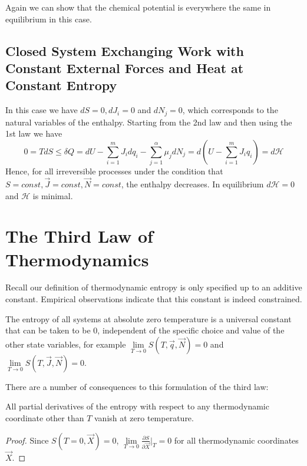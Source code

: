 \documentclass[12pt, a4paper, oneside, openright, titlepage]{book}
\begin{document}
Again we can show that the chemical potential is everywhere the same in equilibrium in this case.

\subsection{Closed System Exchanging Work with Constant External Forces and Heat at Constant Entropy}

In this case we have $dS = 0, dJ_i = 0$ and $dN_j = 0$, which corresponds to the natural variables of the enthalpy. Starting from the 2nd law and then using the 1st law we have \begin{equation*}
    0 = TdS \leq \delta Q = dU - \sum_{i=1}^mJ_idq_i - \sum_{j=1}^{\alpha}\mu_jdN_j = d\left(U-\sum_{i=1}^mJ_iq_i\right) = d\mathcal{H}
\end{equation*}
Hence, for all irreversible processes under the condition that $S = const, \vec{J} = const, \vec{N} = const$, the enthalpy decreases. In equilibrium $d\mathcal{H} = 0$ and $\mathcal{H}$ is minimal.







\section{The Third Law of Thermodynamics}

Recall our definition of thermodynamic entropy is only specified up to an additive constant. Empirical observations indicate that this constant is indeed constrained.

\begin{law}
    The entropy of all systems at absolute zero temperature is a universal constant that can be taken to be $0$, independent of the specific choice and value of the other state variables, for example $\lim\limits_{T\rightarrow 0}S(T,\vec{q},\vec{N}) = 0$ and $\lim\limits_{T\rightarrow 0}S(T,\vec{J},\vec{N}) = 0$.
\end{law}

There are a number of consequences to this formulation of the third law:

\begin{cor}
    All partial derivatives of the entropy with respect to any thermodynamic coordinate other than $T$ vanish at zero temperature.
\end{cor}
\begin{proof}
    Since $S(T=0,\vec{X}) = 0$, $\lim\limits_{T\rightarrow 0}\frac{\partial S}{\partial \vec{X}}\Bigg\rvert_T = 0$ for all thermodynamic coordinates $\vec{X}$.
\end{proof}
\end{document}
